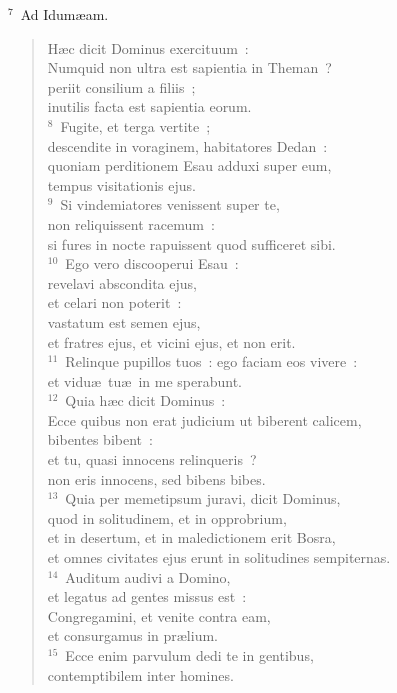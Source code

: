 ${}^{7}$~Ad Idum\ae am. \begin{verse}H\ae c dicit Dominus exercituum~:\\ Numquid non ultra est sapientia in Theman~?\\ periit consilium a filiis~;\\ inutilis facta est sapientia eorum.\\
${}^{8}$~Fugite, et terga vertite~;\\ descendite in voraginem, habitatores Dedan~:\\ quoniam perditionem Esau adduxi super eum,\\ tempus visitationis ejus.\\
${}^{9}$~Si vindemiatores venissent super te,\\ non reliquissent racemum~:\\ si fures in nocte rapuissent quod sufficeret sibi.\\
${}^{10}$~Ego vero discooperui Esau~:\\ revelavi abscondita ejus,\\ et celari non poterit~:\\ vastatum est semen ejus,\\ et fratres ejus, et vicini ejus, et non erit.\\
${}^{11}$~Relinque pupillos tuos~: ego faciam eos vivere~:\\ et vidu\ae\ tu\ae\ in me sperabunt.\\
${}^{12}$~Quia h\ae c dicit Dominus~:\\ Ecce quibus non erat judicium ut biberent calicem,\\ bibentes bibent~:\\ et tu, quasi innocens relinqueris~?\\ non eris innocens, sed bibens bibes.\\
${}^{13}$~Quia per memetipsum juravi, dicit Dominus,\\ quod in solitudinem, et in opprobrium,\\ et in desertum, et in maledictionem erit Bosra,\\ et omnes civitates ejus erunt in solitudines sempiternas.\\
${}^{14}$~Auditum audivi a Domino,\\ et legatus ad gentes missus est~:\\ Congregamini, et venite contra eam,\\ et consurgamus in pr\ae lium.\\
${}^{15}$~Ecce enim parvulum dedi te in gentibus,\\ contemptibilem inter homines.\\

\end{verse}
